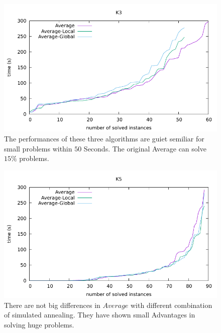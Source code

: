 \documentclass[12pt,a4paper,twoside]{scrartcl}
\numberwithin{equation}{section}
\begin{document}
  \begin{figure}[H]
\begin{center}
  \includegraphics[scale = 1]{DATA/K3/e3a.pdf}
  \end{center}
  \caption{The performances of these three algorithms are guiet semiliar for small problems within $50$ Seconds. The original Average can solve $15\%$ problems.}
  \label{Experiment 4 k3 cactus plot}
  \end{figure}
  \begin{figure}[H]
\begin{center}
  \includegraphics[scale = 1]{DATA/K5/e3a.pdf}
  \end{center}
  \caption{There are not big differences in  $Average$ with different combination of simulated annealing. They have shown small Advantages in  solving huge problems.}
  \label{Experiment 4 k5 cactus plot}
  \end{figure}
\end{document}
